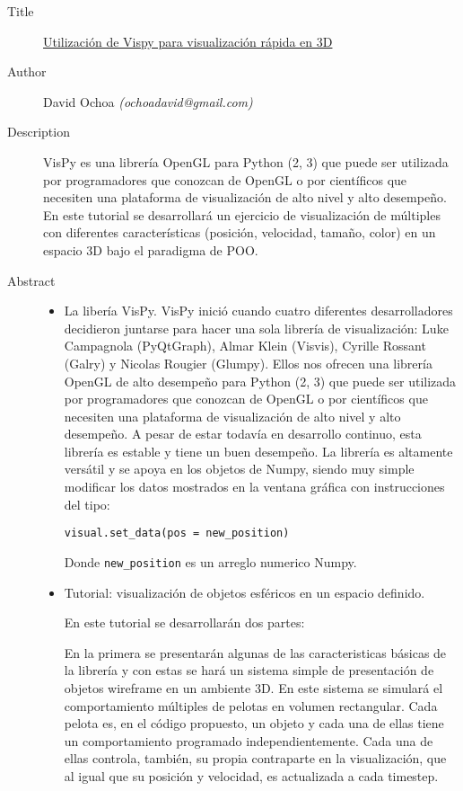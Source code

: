 \begin{description}
   \item[Title] \underline{Utilización de Vispy para visualización rápida en 3D}
   \item[Author] David Ochoa \emph{(ochoadavid@gmail.com)}
   \item[Description] VisPy es una librería OpenGL para Python (2, 3) que puede ser utilizada por programadores que conozcan de OpenGL o por científicos que necesiten una plataforma de visualización de alto nivel y alto desempeño. En este tutorial se desarrollará un ejercicio de visualización de múltiples con diferentes características (posición, velocidad, tamaño, color) en un espacio 3D bajo el paradigma de POO. 
   \item[Abstract] \begin{itemize} 
      \item La libería VisPy. VisPy inició cuando cuatro diferentes desarrolladores decidieron juntarse para hacer una sola librería de visualización: Luke Campagnola (PyQtGraph), Almar Klein (Visvis), Cyrille Rossant (Galry) y Nicolas Rougier (Glumpy). Ellos nos ofrecen una librería OpenGL de alto desempeño para Python (2, 3) que puede ser utilizada por programadores que conozcan de OpenGL o por científicos que necesiten una plataforma de visualización de alto nivel y alto desempeño. A pesar de estar todavía en desarrollo continuo, esta librería es estable y tiene un buen desempeño. La librería es altamente versátil y se apoya en los objetos de Numpy, siendo muy simple modificar los datos mostrados en la ventana gráfica con instrucciones del tipo:
      
\verb+visual.set_data(pos = new_position)+

Donde \verb+new_position+ es un arreglo numerico Numpy.

\item Tutorial: visualización de objetos esféricos en un espacio definido.

En este tutorial se desarrollarán dos partes:

    En la primera se presentarán algunas de las caracteristicas básicas de la librería y con estas se hará un sistema simple de presentación de objetos wireframe en un ambiente 3D. En este sistema se simulará el comportamiento múltiples de pelotas en volumen rectangular. Cada pelota es, en el código propuesto, un objeto y cada una de ellas tiene un comportamiento programado independientemente. Cada una de ellas controla, también, su propia contraparte en la visualización, que al igual que su posición y velocidad, es actualizada a cada timestep.


\end{itemize}
\end{description}
